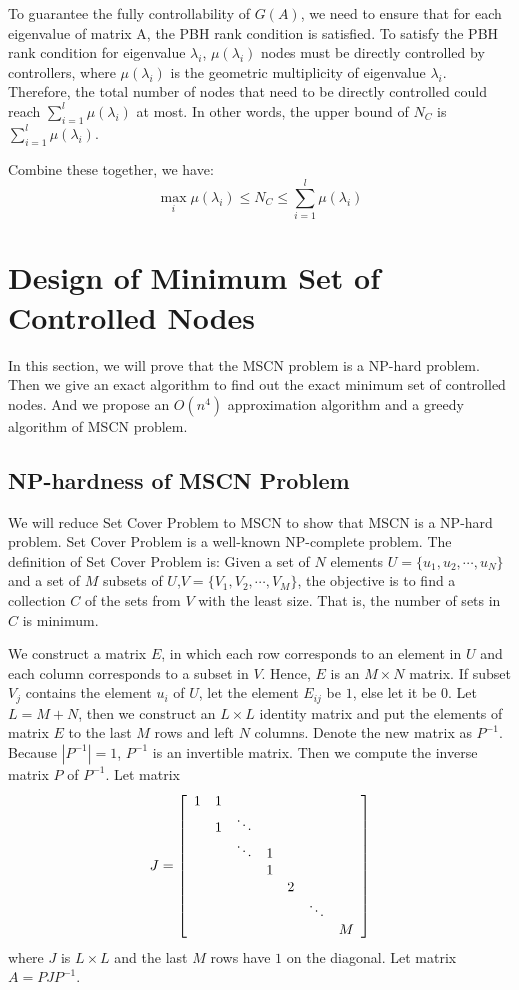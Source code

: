 \documentclass[10pt, conference, letterpaper]{IEEEtran}
\begin{document}
To guarantee the fully controllability of $G(A)$, we need to ensure that for each eigenvalue of matrix A, the PBH rank condition is satisfied. To satisfy the PBH rank condition for eigenvalue $\lambda_i$, $\mu(\lambda_i)$ nodes must be directly controlled by controllers, where $\mu(\lambda_i)$ is the geometric multiplicity of eigenvalue $\lambda_i$.
Therefore, the total number of nodes that need to be directly controlled could reach $\sum\limits_{i=1}^l \mu(\lambda_i)$ at most. In other words, the upper bound of $N_C$ is $\sum\limits_{i=1}^l \mu(\lambda_i)$.

Combine these together, we have:
\begin{equation*}
\max_i {\mu(\lambda_i)} \le N_C \le \sum\limits_{i=1}^l \mu(\lambda_i)
\end{equation*}

\section{Design of Minimum Set of Controlled Nodes}
In this section, we will prove that the MSCN problem is a NP-hard problem. Then we give an exact algorithm to find out the exact minimum set of controlled nodes. And we propose an $O(n^4)$ approximation algorithm  and a greedy algorithm of MSCN problem.

\subsection{NP-hardness of MSCN Problem}
We will reduce Set Cover Problem to MSCN to show that MSCN is a NP-hard problem. Set Cover Problem is a well-known NP-complete problem. The definition of Set Cover Problem is: Given a set of $N$ elements $U=\{u_1,u_2,\cdots,u_N\}$ and a set of $M$ subsets of $U$,$V=\{V_1,V_2,\cdots,V_M\}$, the objective is to find a collection $C$ of the sets from $V$ with the least size. That is, the number of sets in $C$ is minimum.

We construct a matrix $E$, in which each row corresponds to an element in $U$ and each column corresponds to a subset in $V$. Hence, $E$ is an $M \times N $ matrix. If subset $V_j$ contains the element $u_i$ of $U$, let the element $E_{ij}$ be $1$, else let it be $0$. Let $L=M+N$, then we construct an $L\times L$ identity matrix and put the elements of matrix $E$ to the last $M$ rows and left $N$ columns. Denote the new matrix as $P^{-1}$. Because $|P^{-1}|=1$, $P^{-1}$ is an invertible matrix. Then we compute the inverse matrix $P$ of $P^{-1}$. Let matrix
\begin{equation*}
J = {\left[ \begin{array}{c c c c c c c}
1 & 1 &   &   &  & &\\
  & 1 & \ddots && & &\\
 & & \ddots & 1 & & &\\
 &  &  &  1& & &\\
 & & & & 2& & \\
& & & & &\ddots  &\\
& & & & & & M
\end{array}
\right ]}
\end{equation*}
where $J$ is $L\times L$ and the last $M$ rows have $1$ on the diagonal. Let matrix $A = PJP^{-1}$.
\end{document}
